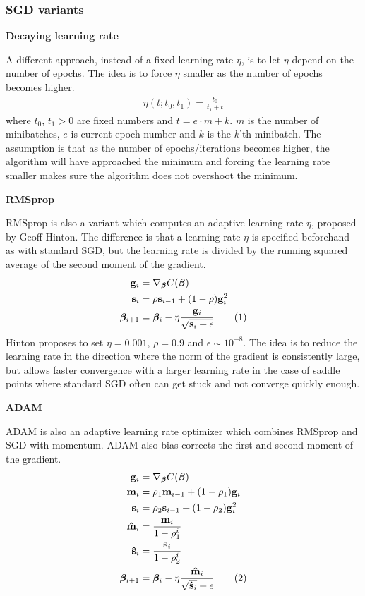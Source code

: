 \documentclass[a4paper,twocolumn]{article}
\newcommand\numberthis{\addtocounter{equation}{1}\tag{\theequation}}
\newcommand{\B}{\boldsymbol{\beta}}
\begin{document}
\subsubsection{SGD variants}
\begin{center}
    \textbf{Decaying learning rate}
\end{center}
A different approach, instead of a fixed learning rate $\eta$, is to let $\eta$ depend on the number of epochs. The idea is to force $\eta$ smaller as the number of epochs becomes higher. 
\begin{align}
    \eta(t; t_{0}, t_{1}) = \frac{t_{0}}{t_{1} + t}
\end{align}
where $t_{0}$, $t_{1} > 0$ are fixed numbers and $t = e\cdot m + k$. $m$ is the number of minibatches, $e$ is current epoch number and $k$ is the $k$'th minibatch. The assumption is that as the number of epochs/iterations becomes higher, the algorithm will have approached the minimum and forcing the learning rate smaller makes sure the algorithm does not overshoot the minimum.
\begin{center}
    \textbf{RMSprop}
\end{center}
RMSprop is also a variant which computes an adaptive learning rate $\eta$, proposed by Geoff Hinton\cite{rmsprop}. The difference is that a  learning rate $\eta$ is specified beforehand as with standard SGD, but the learning rate is divided by the running squared average of the second moment of the gradient.
\begin{align*}
    \mathbf{g}_{i} &= \nabla_{\B}C(\B)\\
    \mathbf{s}_{i} &= \rho \mathbf{s}_{i-1} + (1 - \rho)\mathbf{g}_{i}^{2}\\
    \B_{i+1} &= \B_{i} - \eta\frac{\mathbf{g}_{i}}{\sqrt{\mathbf{s}_{i} + \epsilon}} \numberthis\label{eqn}
\end{align*}
Hinton proposes to set $\eta = 0.001$, $\rho = 0.9$ and $\epsilon \sim 10^{-8}$. The idea is to reduce the learning rate in the direction where the norm of the gradient is consistently large, but allows faster convergence with a larger learning rate in the case of saddle points where standard SGD often can get stuck and not converge quickly enough.
\begin{center}
    \textbf{ADAM}
\end{center}
ADAM is also an adaptive learning rate optimizer which combines RMSprop and SGD with momentum. ADAM also bias corrects the first and second moment of the gradient.\\
\begin{align*}
    \mathbf{g}_{i} &= \nabla_{\B}C(\B)\\
    \mathbf{m}_{i} &= \rho_{1} \mathbf{m}_{i-1} + (1 - \rho_{1})\mathbf{g}_{i}\\
    \mathbf{s}_{i} &= \rho_{2} \mathbf{s}_{i-1} + (1 - \rho_{2})\mathbf{g}_{i}^{2}\\
    \mathbf{\hat{m}}_{i} &= \frac{\mathbf{m}_{i}}{1 - \rho_{1}^{i}}\\
    \mathbf{\hat{s}}_{i} &= \frac{\mathbf{s}_{i}}{1 - \rho_{2}^{i}}\\
    \B_{i+1} &= \B_{i} - \eta\frac{\mathbf{\hat{m}}_{i}}{\sqrt{\mathbf{\hat{s}}_{i}} + \epsilon} \numberthis\label{eqn}
\end{align*}
\end{document}
